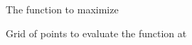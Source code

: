 \begin{frame}
    
    \begin{figure}
       \begin{center}
           \caption{The function to maximize}
       \end{center}
    \end{figure}

\end{frame}



\begin{frame}
    
    \begin{figure}
       \begin{center}
           \caption{Grid of points to evaluate the function at}
       \end{center}
    \end{figure}

\end{frame}

